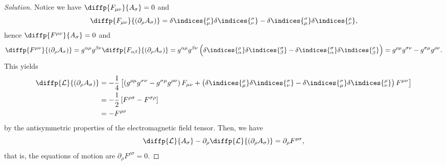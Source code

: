 \begin{proof}[Solution]
    Notice we have \(\diffp{F_{\mu\nu}}{A_\sigma} = 0\) and
    \begin{equation*}
       \diffp{F_{\mu\nu}}{(\partial_\rho A_\sigma)} = \delta\indices{^\rho_\mu}\delta\indices{^\sigma_\nu} - \delta\indices{^\sigma_\mu}\delta\indices{^\rho_\nu},
    \end{equation*}
    hence \(\diffp{F^{\mu\nu}}{A_\sigma} = 0\) and
    \begin{equation*}
        \diffp{F^{\mu\nu}}{(\partial_\rho A_\sigma)} = g^{\alpha \mu} g^{\beta \nu} \diffp{F_{\alpha \beta}}{(\partial_\rho A_\sigma)} = g^{\alpha \mu} g^{\beta \nu} \left(\delta\indices{^\rho_\alpha}\delta\indices{^\sigma_\beta} - \delta\indices{^\sigma_\alpha}\delta\indices{^\rho_\beta}\right) = g^{\rho \mu} g^{\sigma \nu} - g^{\sigma \mu} g^{\rho \nu}.
    \end{equation*}
    This yields
    \begin{align*}
        \diffp{\mathcal{L}}{(\partial_\rho A_\sigma)} &= - \frac14 \left[ \left(g^{\rho\mu} g^{\sigma \nu} - g^{\sigma \mu} g^{\rho \nu}\right)F_{\mu\nu} + \left(\delta\indices{^\rho_\mu}\delta\indices{^\sigma_\nu} - \delta\indices{^\sigma_\mu}\delta\indices{^\rho_\nu}\right)F^{\mu\nu}\right]\\
                                                      &= - \frac12 \left[F^{\rho\sigma} - F^{\sigma \rho}\right]\\
                                                      &= - F^{\rho\sigma}
    \end{align*}
    by the antisymmetric properties of the electromagnetic field tensor. Then, we have 
    \begin{equation*}
        \diffp{\mathcal{L}}{A_\sigma} - \partial_\rho\diffp{\mathcal{L}}{(\partial_\rho A_\sigma)} 
        = \partial_\rho F^{\rho \sigma},
    \end{equation*}
    that is, the equations of motion are \(\partial_\rho F^{\rho \sigma} = 0\).


\end{proof}
